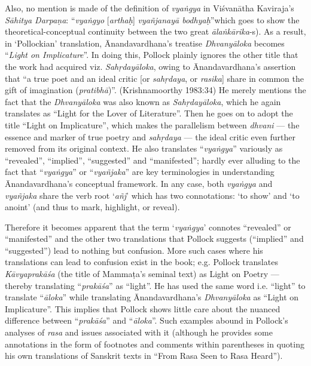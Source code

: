 Also, no mention is made of the definition of \textsl{vyaṅgya} in Viśvanātha Kaviraja’s \textsl{Sāhitya Darpaṇa}: “\textsl{vyaṅgyo} [\textsl{arthaḥ}] \textsl{vyañjanayā bodhyaḥ}” which goes to show the theoretical-conceptual continuity between the two great \textsl{ālaṅkārika}-s). As a result, in ‘Pollockian’ translation, Ānandavardhana’s treatise \textsl{Dhvanyāloka} becomes “\textsl{Light on Implicature}”. In doing this, Pollock plainly ignores the other title that the work had acquired viz. \textsl{Sahṛdayāloka}, owing to Ānandavardhana’s assertion that “a true poet and an ideal critic [or \textsl{sahṛdaya}, or \textsl{rasika}] share in common the gift of imagination (\textsl{pratibhā})”. (Krishnamoorthy 1983:34) He merely mentions the fact that the \textsl{Dhvanyāloka} was also known as \textsl{Sahṛdayāloka}, which he again translates as “Light for the Lover of Literature”. Then he goes on to adopt the title “Light on Implicature”, which makes the parallelism between \textsl{dhvani} --- the essence and marker of true poetry and \textsl{sahṛdaya} --- the ideal critic even further removed from its original context. He also translates “\textsl{vyaṅgya}” variously as “revealed”, “implied”, “suggested” and “manifested”; hardly ever alluding to the fact that “\textsl{vyaṅgya}” or “\textsl{vyañjaka}” are key terminologies in understanding Ānandavardhana’s conceptual framework. In any case, both \textsl{vyaṅgya} and \textsl{vyañjaka} share the verb root ‘\textsl{añj}’ which has two connotations: ‘to show’ and ‘to anoint’ (and thus to mark, highlight, or reveal). 

Therefore it becomes apparent that the term ‘\textsl{vyaṅgya}’ connotes “revealed” or “manifested” and the other two translations that Pollock suggests (“implied” and “suggested”) lead to nothing but confusion. More such cases where his translations can lead to confusion exist in the book; e.g. Pollock translates \textsl{Kāvyaprakāśa} (the title of Mammaṭa’s seminal text) as Light on Poetry --- thereby translating “\textsl{prakāśa}” as “light”. He has used the same word i.e. “light” to translate “\textsl{āloka}” while translating Ānandavardhana’s \textsl{Dhvanyāloka} as “Light on Implicature”. This implies that Pollock shows little care about the nuanced difference between “\textsl{prakāśa}” and “\textsl{āloka}”. Such examples abound in Pollock’s analyses of \textsl{rasa} and issues associated with it (although he provides some annotations in the form of footnotes and comments within parentheses in quoting his own translations of Sanskrit texts in “From Rasa Seen to Rasa Heard”). 

